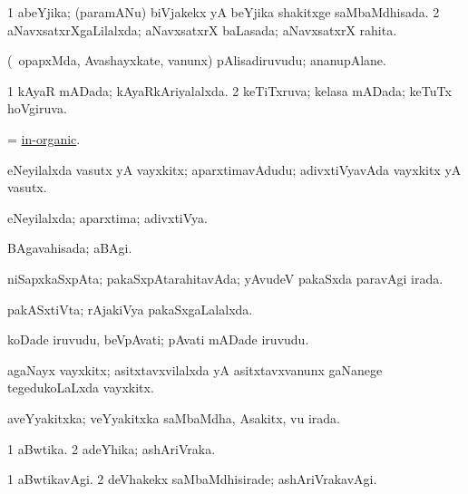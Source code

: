 \bentry
{}
\gl{\gu}
\bmng
\bnum
\num{1} abeYjika; (paramANu) biVjakekx yA beYjika shakitxge saMbaMdhisada. 
\num{2} aNavxsatxrXgaLilalxda; aNavxsatxrX baLasada; aNavxsatxrX rahita. 
\enum
\emng
\eentry

\bentry
{}
\gl{\nA}
\bmng
(\kanmu\ opapxMda, Avashayxkate, \mo vanunx) pAlisadiruvudu; ananupAlane. 
\emng
\eentry

\bentry
{}
\gl{\gu}
\bmng
\bnum
\num{1} kAyaR mADada; kAyaRkAriyalalxda. 
\num{2} keTiTxruva; kelasa mADada; keTuTx hoVgiruva. 
\enum
\emng
\eentry

\bentry
{}
\gl{\gu}
\bmng
= \hyperref{kandict_i.pdf}{I}{inorganic}{in-organic}. 
\emng
\eentry

\bentry
{}
\gl{\nA}
\bmng
eNeyilalxda vasutx yA vayxkitx; aparxtimavAdudu; adivxtiVyavAda vayxkitx yA vasutx. 
\emng
\eentry

\bentry
{}
\gl{\gu}
\bmng
eNeyilalxda; aparxtima; adivxtiVya. 
\emng
\eentry

\bentry
{}
\gl{\gu}
\bmng
BAgavahisada; aBAgi. 
\emng
\eentry

\bentry
{}
\gl{\gu}
\bmng
niSapxkaSxpAta; pakaSxpAtarahitavAda; yAvudeV pakaSxda paravAgi irada. 
\emng
\eentry

\bentry
{}
\gl{\gu}
\bmng
pakASxtiVta; rAjakiVya pakaSxgaLalalxda. 
\emng
\eentry

\bentry
{}
\gl{\nA}
\bmng
koDade iruvudu, beVpAvati; pAvati mADade iruvudu. 
\emng
\eentry

\bentry
{}
\gl{\nA}
\bmng
agaNayx vayxkitx; asitxtavxvilalxda yA asitxtavxvanunx gaNanege tegedukoLaLxda vayxkitx. 
\emng
\eentry

\bentry
{}
\gl{\gu}
\bmng
aveYyakitxka; veYyakitxka saMbaMdha, Asakitx, \mo vu irada. 
\emng
\eentry

\bentry
{}
\gl{\gu}
\bmng
\bnum
\num{1} aBwtika. 
\num{2} adeYhika; ashAriVraka. 
\enum
\emng
\eentry

\bentry
{}
\gl{\kirxvi}
\bmng
\bnum
\num{1} aBwtikavAgi. 
\num{2} deVhakekx saMbaMdhisirade; ashAriVrakavAgi. 
\enum
\emng
\eentry

